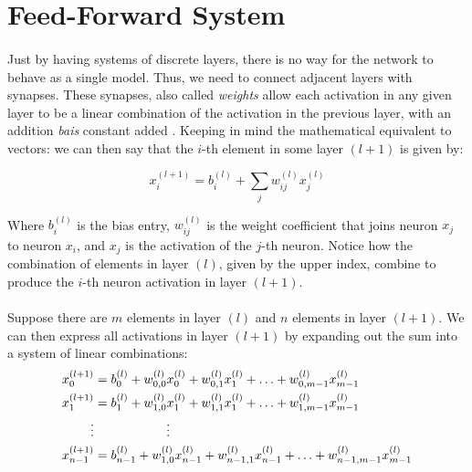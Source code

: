 \documentclass[12pt,letterpaper]{article}
\begin{document}
\section*{Feed-Forward System}

\paragraph*{}Just by having systems of discrete layers, there is no way for the network to behave as a single model. Thus, we need to connect adjacent layers with synapses. These synapses, also called \textit{weights} allow each activation in any given layer to be a linear combination of the activation in the previous layer, with an addition \textit{bais} constant added \cite{Geron,Loy}. Keeping in mind the mathematical equivalent to vectors: we can then say that the $i$-th element in some layer $(l+1)$ is given by:

\begin{equation}
\label{single element}
x^{(l+1)}_i = b^{(l)}_i + \sum_{j} w^{(l)}_{ij} x^{(l)}_j
\end{equation}

Where $b^{(l)}_i$ is the bias entry, $w^{(l)}_{ij}$ is the weight coefficient that joins neuron $x_j$ to neuron $x_i$, and $x_j$ is the activation of the $j$-th neuron.  Notice how the combination of elements in layer $(l)$, given by the upper index, combine to produce the $i$-th neuron activation in layer $(l+1)$. 

\paragraph*{}Suppose there are $m$ elements in layer $(l)$ and $n$ elements in layer $(l+1)$. We can then express all activations in layer $(l+1)$ by expanding out the sum into a system of linear combinations:
\begin{equation}
\begin{split}
\label{system elements}
x^{(l+1)}_0 &= b^{(l)}_0 + w^{(l)}_{0,0} x^{(l)}_0 + w^{(l)}_{0,1} x^{(l)}_1 + \hdots + w^{(l)}_{0,m-1} x^{(l)}_{m-1}  \\
x^{(l+1)}_1 &= b^{(l)}_1 + w^{(l)}_{1,0} x^{(l)}_1 + w^{(l)}_{1,1} x^{(l)}_1 + \hdots + w^{(l)}_{1,m-1} x^{(l)}_{m-1}  \\
\vdots & \text{\hspace{2cm}} \vdots \\
x^{(l+1)}_{n-1} &= b^{(l)}_{n-1} + w^{(l)}_{1,0} x^{(l)}_{n-1} + w^{(l)}_{n-1,1} x^{(l)}_{n-1} + \hdots + w^{(l)}_{n-1,m-1} x^{(l)}_{m-1}  \\
\end{split}
\end{equation}
\end{document}
